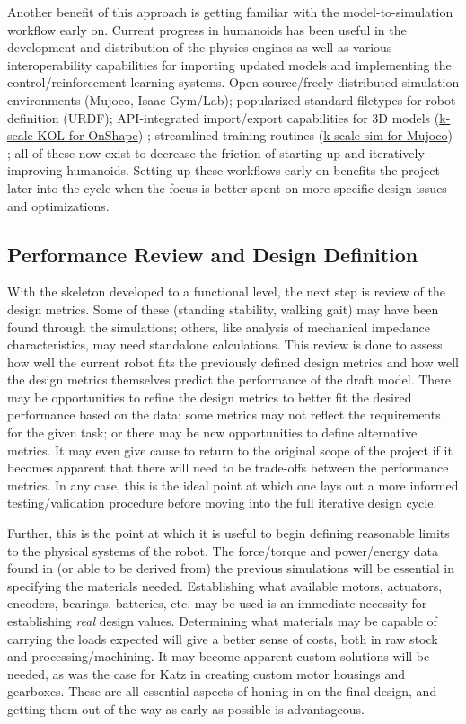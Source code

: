 \documentclass{article}
\begin{document}
Another benefit of this approach is getting familiar with the model-to-simulation workflow early on. Current progress in humanoids has been useful in the development and distribution of the physics engines as well as various interoperability capabilities for importing updated models and implementing the control/reinforcement learning systems. Open-source/freely distributed simulation environments (Mujoco, Isaac Gym/Lab);
popularized standard filetypes for robot definition (URDF);
API-integrated import/export capabilities for 3D models (\href{https://github.com/kscalelabs/onshape}{k-scale KOL for OnShape}) \cite{kscalelabsonshape_2024}; %
streamlined training routines (\href{https://github.com/kscalelabs/sim}{k-scale sim for Mujoco}) \cite{kscalelabssim_2024}; %
all of these now exist to decrease the friction of starting up and iteratively improving humanoids. Setting up these workflows early on benefits the project later into the cycle when the focus is better spent on more specific design issues and optimizations.

\subsection{Performance Review and Design Definition}

With the skeleton developed to a functional level, the next step is review of the design metrics. Some of these (standing stability, walking gait) may have been found through the simulations; others, like analysis of mechanical impedance characteristics, may need standalone calculations. This review is done to assess how well the current robot fits the previously defined design metrics and how well the design metrics themselves predict the performance of the draft model. There may be opportunities to refine the design metrics to better fit the desired performance based on the data; some metrics may not reflect the requirements for the given task; or there may be new opportunities to define alternative metrics. It may even give cause to return to the original scope of the project if it becomes apparent that there will need to be trade-offs between the performance metrics. In any case, this is the ideal point at which one lays out a more informed testing/validation procedure before moving into the full iterative design cycle.

Further, this is the point at which it is useful to begin defining reasonable limits to the physical systems of the robot. The force/torque and power/energy data found in (or able to be derived from) the previous simulations will be essential in specifying the materials needed. Establishing what available motors, actuators, encoders, bearings, batteries, etc. may be used is an immediate necessity for establishing \textit{real} design values. Determining what materials may be capable of carrying the loads expected will give a better sense of costs, both in raw stock and processing/machining. It may become apparent custom solutions will be needed, as was the case for Katz in creating custom motor housings and gearboxes. \cite{katz_low_2018}
These are all essential aspects of honing in on the final design, and getting them out of the way as early as possible is advantageous.
\end{document}

